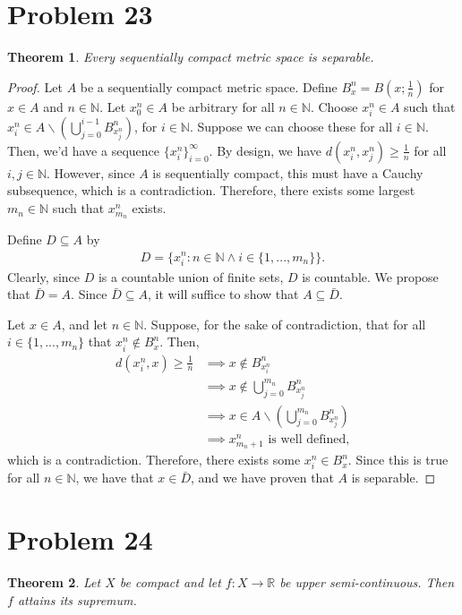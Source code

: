 \documentclass[10pt,a4paper]{article}
\theoremstyle{theorem}
\newtheorem{theorem}{Theorem}
\theoremstyle{definition}
\begin{document}
\section*{Problem 23}
\begin{theorem}
Every sequentially compact metric space is separable. 
\end{theorem}

\begin{proof}
Let $A$ be a sequentially compact metric space. Define $B_{x}^n = B(x; \frac{1}{n})$ for $x \in A$ and $n \in \mathbb{N}$. Let $x_{0}^n \in A$ be arbitrary for all $n \in \mathbb{N}$. Choose $x_{i}^n \in A$ such that $x_{i}^n \in A \backslash(\bigcup_{j = 0}^{i - 1} B_{x_{j}^n}^n)$, for $i \in \mathbb{N}$. Suppose we can choose these for all $i \in \mathbb{N}$. Then,  we'd have a sequence $\{x_{i}^n\}_{i = 0}^\infty$. By design, we have $d(x_{i}^n, x_{j}^n) \geq \frac{1}{n}$ for all $i,j \in \mathbb{N}$. However, since $A$ is sequentially compact, this must have a Cauchy subsequence, which is a contradiction. Therefore, there exists some largest $m_n \in \mathbb{N}$ such that $x_{m_n}^n$ exists.

Define $D \subseteq A$ by 
\begin{align*}
D = \{x_{i}^n : n \in \mathbb{N} \land i \in \{1,..., m_n \}\}.
\end{align*}
Clearly, since $D$ is a countable union of finite sets, $D$ is countable. We propose that $\bar{D} = A$. Since $\bar{D} \subseteq A$, it will suffice to show that $A \subseteq \bar{D}$.

Let $x \in A$, and let $n \in \mathbb{N}$. Suppose, for the sake of contradiction, that for all $i \in \{1, ..., m_n\}$ that $x_{i}^n \not \in B_{x}^n$. Then,
\begin{align*}
d(x_{i}^n, x) \geq \frac{1}{n} &\implies x \not \in B_{x_{i}^n}^n\\
&\implies x \not \in \bigcup_{j = 0}^{m_n} B_{x_{j}^n}^n\\
&\implies x \in A \backslash \left(\bigcup_{j = 0}^{m_n} B_{x_{j}^n}^n\right)\\
&\implies x^{n}_{m_n + 1} \text{ is well defined,}
\end{align*}
which is a contradiction. Therefore, there exists some $x_i^n \in B_x^n$. Since this is true for all $n \in \mathbb{N}$, we have that $x \in \bar{D}$, and we have proven that $A$ is separable.
\end{proof}

\section*{Problem 24}
\begin{theorem}
Let $X$ be compact and let $f:X \to \mathbb{R}$ be upper semi-continuous. Then $f$ attains its supremum.
\end{theorem}
\end{document}
